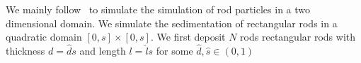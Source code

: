 We mainly follow~\cite{SED} to simulate the simulation of rod particles in a two dimensional domain.
We simulate the sedimentation of rectangular rods in a quadratic domain $[0,s]×[0,s]$. We first deposit $N$ rods rectangular rods with thickness $d = \hat ds$ and length $l = \hat ls$ for some $\hat d,\hat s∈(0,1)$
\cite{BD}



 
